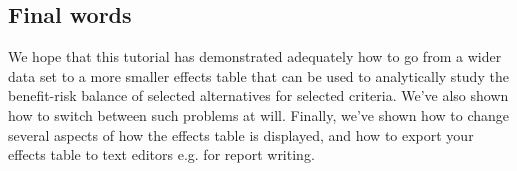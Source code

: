 \documentclass[00_mcda_tutorial.tex]{subfiles}
\begin{document}
\subsection*{Final words}
We hope that this tutorial has demonstrated adequately how to go from a wider data set to a more smaller effects table that can be used to analytically study the benefit-risk balance of selected alternatives for selected criteria. We’ve also shown how to switch between such problems at will. Finally, we’ve shown how to change several aspects of how the effects table is displayed, and how to export your effects table to text editors e.g. for report writing.
\end{document}
